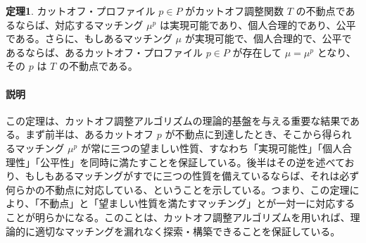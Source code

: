 \documentclass[12pt, a4paper]{article}
\theoremstyle{definition}
\theoremstyle{remark}
\theoremstyle{plain}
\begin{document}
\textbf{定理1}. カットオフ・プロファイル $p \in P$ がカットオフ調整関数 $T$ の不動点であるならば、対応するマッチング $\mu^p$ は実現可能であり、個人合理的であり、公平である。さらに、もしあるマッチング $\mu$ が実現可能で、個人合理的で、公平であるならば、あるカットオフ・プロファイル $p \in P$ が存在して $\mu = \mu^p$ となり、その $p$ は $T$ の不動点である。


\paragraph{説明}
この定理は、カットオフ調整アルゴリズムの理論的基盤を与える重要な結果である。まず前半は、あるカットオフ $p$ が不動点に到達したとき、そこから得られるマッチング $\mu^p$ が常に三つの望ましい性質、すなわち「実現可能性」「個人合理性」「公平性」を同時に満たすことを保証している。後半はその逆を述べており、もしもあるマッチングがすでに三つの性質を備えているならば、それは必ず何らかの不動点に対応している、ということを示している。つまり、この定理により、「不動点」と「望ましい性質を満たすマッチング」とが一対一に対応することが明らかになる。このことは、カットオフ調整アルゴリズムを用いれば、理論的に適切なマッチングを漏れなく探索・構築できることを保証している。








    
\end{document}
